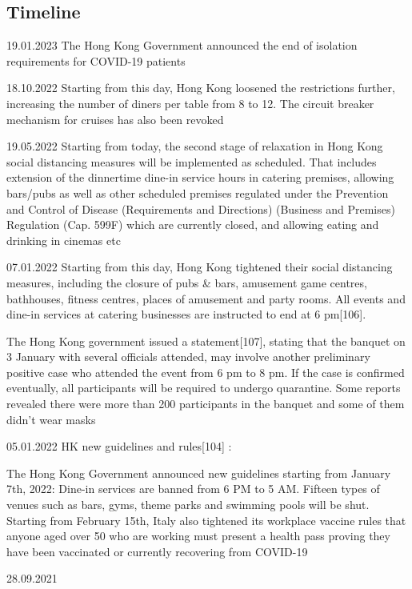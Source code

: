 
\subsection{Timeline}


19.01.2023
The Hong Kong Government announced the end of isolation requirements for COVID-19 patients


18.10.2022
Starting from this day, Hong Kong loosened the restrictions further, increasing the number of diners per table from 8 to 12. The circuit breaker mechanism for cruises has also been revoked

19.05.2022
Starting from today, the second stage of relaxation in Hong Kong social distancing measures will be implemented as scheduled. That includes extension of the dinnertime dine-in service hours in catering premises, allowing bars/pubs as well as other scheduled premises regulated under the Prevention and Control of Disease (Requirements and Directions) (Business and Premises) Regulation (Cap. 599F) which are currently closed, and allowing eating and drinking in cinemas etc

07.01.2022
Starting from this day, Hong Kong tightened their social distancing measures, including the closure of pubs & bars, amusement game centres, bathhouses, fitness centres, places of amusement and party rooms. All events and dine-in services at catering businesses are instructed to end at 6 pm[106].

The Hong Kong government issued a statement[107], stating that the banquet on 3 January with several officials attended, may involve another preliminary positive case who attended the event from 6 pm to 8 pm. If the case is confirmed eventually, all participants will be required to undergo quarantine. Some reports revealed there were more than 200 participants in the banquet and some of them didn’t wear masks

05.01.2022
HK new guidelines and rules[104] :

The Hong Kong Government announced new guidelines starting from January 7th, 2022: 
Dine-in services are banned from 6 PM to 5 AM. 
Fifteen types of venues such as bars, gyms, theme parks and swimming pools will be shut.
Starting from February 15th, Italy also tightened its workplace vaccine rules that anyone aged over 50 who are working must present a health pass proving they have been vaccinated or currently recovering from COVID-19

28.09.2021

